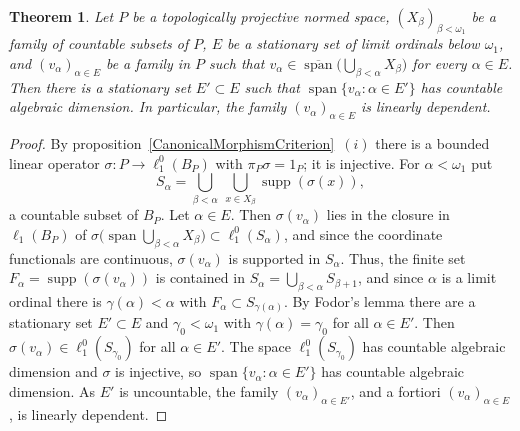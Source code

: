 \documentclass[12pt]{article}
\newtheorem{theorem}{Theorem}[section]
\newcommand{\lo}[1]{\ell_1^0(#1)}
\newcommand{\ellone}[1]{\ell_1(#1)}
\newcommand{\supp}{\operatorname{supp}}
\newcommand{\Lin}{\operatorname{span}}
\begin{document}
\begin{theorem}\label{FodorObstruction} Let $P$ be a topologically
    projective normed space, ${(X_\beta)}_{\beta<\omega_1}$ be a family of
    countable subsets of $P$, $E$ be a stationary set of limit ordinals below
    $\omega_1$, and ${(v_\alpha)}_{\alpha\in E}$ be a family in $P$ such that
    $v_\alpha\in\overline{\Lin}\bigl(\bigcup_{\beta<\alpha}X_\beta\bigr)$ for
    every $\alpha\in E$. Then there is a stationary set $E'\subset E$ such that
    $\Lin\{v_\alpha:\alpha\in E'\}$ has countable algebraic dimension. In
    particular, the family ${(v_\alpha)}_{\alpha\in E}$ is linearly dependent.
\end{theorem}
\begin{proof} By proposition~\ref{CanonicalMorphismCriterion}~$(i)$ there is
    a bounded linear operator $\sigma:P\to\lo{B_P}$ with $\pi_P\sigma=1_P$; it
    is injective. For $\alpha<\omega_1$ put
    \[
    S_\alpha=\bigcup_{\beta<\alpha}\ \bigcup_{x\in X_\beta}\supp(\sigma(x)),
    \]
    a countable subset of $B_P$. Let $\alpha\in E$. Then $\sigma(v_\alpha)$
    lies in the closure in $\ellone{B_P}$ of
    $\sigma\bigl(\Lin\bigcup_{\beta<\alpha}X_\beta\bigr)\subset\lo{S_\alpha}$,
    and since the coordinate functionals are continuous, $\sigma(v_\alpha)$ is
    supported in $S_\alpha$. Thus, the finite set $F_\alpha=\supp(\sigma(v_\alpha))$
    is contained in $S_\alpha=\bigcup_{\beta<\alpha}S_{\beta+1}$, and since
    $\alpha$ is a limit ordinal there is $\gamma(\alpha)<\alpha$ with
    $F_\alpha\subset S_{\gamma(\alpha)}$. By Fodor's lemma there are a
    stationary set $E'\subset E$ and $\gamma_0<\omega_1$ with
    $\gamma(\alpha)=\gamma_0$ for all $\alpha\in E'$. Then
    $\sigma(v_\alpha)\in\lo{S_{\gamma_0}}$ for all $\alpha\in E'$. The space
    $\lo{S_{\gamma_0}}$ has countable algebraic dimension and $\sigma$ is
    injective, so $\Lin\{v_\alpha:\alpha\in E'\}$ has countable algebraic
    dimension. As $E'$ is uncountable, the family ${(v_\alpha)}_{\alpha\in E'}$,
    and a fortiori ${(v_\alpha)}_{\alpha\in E}$, is linearly dependent.
\end{proof}
\end{document}
